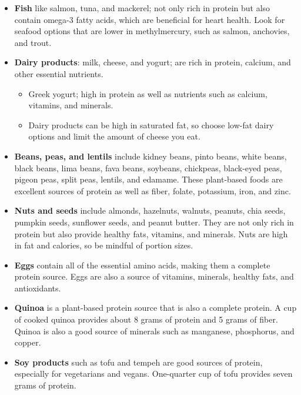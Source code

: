 \documentclass[8pt]{extarticle}
\begin{document}
\begin{itemize}
	\item \textbf{Fish} like salmon, tuna, and mackerel; not only rich in protein but also contain omega-3 fatty acids, which are beneficial for heart health. Look for seafood options that are lower in methylmercury, such as salmon, anchovies, and trout.
	\item \textbf{Dairy products}: milk, cheese, and yogurt; are rich in protein, calcium, and other essential nutrients. 
	\begin{itemize}
		\item Greek yogurt; high in protein as well as nutrients such as calcium, vitamins, and minerals. 
		\item Dairy products can be high in saturated fat, so choose low-fat dairy options and limit the amount of cheese you eat.
	\end{itemize}		
	\item \textbf{Beans, peas, and lentils} include kidney beans, pinto beans, white beans, black beans, lima beans, fava beans, soybeans, chickpeas, black-eyed peas, pigeon peas, split peas, lentils, and edamame. These plant-based foods are excellent sources of protein as well as fiber, folate, potassium, iron, and zinc.
	\item \textbf{Nuts and seeds} include almonds, hazelnuts, walnuts, peanuts, chia seeds, pumpkin seeds, sunflower seeds, and peanut butter. They are not only rich in protein but also provide healthy fats, vitamins, and minerals. Nuts are high in fat and calories, so be mindful of portion sizes.
	\item \textbf{Eggs} contain all of the essential amino acids, making them a complete protein source. Eggs are also a source of vitamins, minerals, healthy fats, and antioxidants.
	\item \textbf{Quinoa} is a plant-based protein source that is also a complete protein. A cup of cooked quinoa provides about 8 grams of protein and 5 grams of fiber. Quinoa is also a good source of minerals such as manganese, phosphorus, and copper.
	\item \textbf{Soy products} such as tofu and tempeh are good sources of protein, especially for vegetarians and vegans. One-quarter cup of tofu provides seven grams of protein.
\end{itemize}



\end{document}
